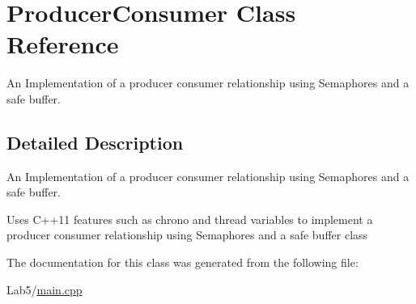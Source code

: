 \hypertarget{class_producer_consumer}{}\section{Producer\+Consumer Class Reference}
\label{class_producer_consumer}


An Implementation of a producer consumer relationship using Semaphores and a safe buffer.  




\subsection{Detailed Description}
An Implementation of a producer consumer relationship using Semaphores and a safe buffer. 

Uses C++11 features such as chrono and thread variables to implement a producer consumer relationship using Semaphores and a safe buffer class 

The documentation for this class was generated from the following file\+:\begin{DoxyCompactItemize}
\item 
Lab5/\hyperlink{main_8cpp}{main.\+cpp}\end{DoxyCompactItemize}
